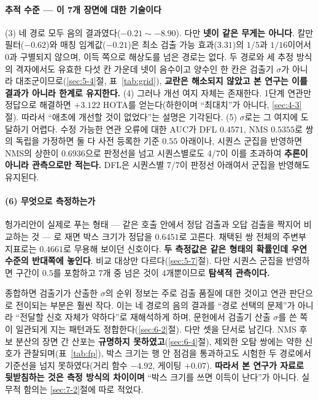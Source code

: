 \documentclass[12pt,a4paper,oneside]{report}
\begin{document}
\paragraph{추적 수준 --- 이 7개 장면에 대한 기술이다} (3) 네 경로 모두 음의 결과였다($-0.21 \sim -8.90$). 다만 \textbf{넷이 같은 무게는 아니다}. 칼만 필터($-0.62$)와 매칭 임계값($-0.21$)은 최소 검출 가능 효과($3.31$)의 $1/5$과 $1/16$이어서 $0$과 구별되지 않으며, 이득 쪽으로 해상도를 넘은 경로는 없다. 두 경로와 세 추정 방식의 격자에서도 유효한 다섯 칸 가운데 넷이 음수이고 양수인 한 칸은 검출기 $\sigma$가 아니라 대조군이므로(\ref{sec:5-4}절, 표~\ref{tab:grid}), \textbf{교란은 해소되지 않았고 본 연구는 이를 결과가 아니라 한계로 유지한다.} (4) 그러나 개선 여지 자체는 존재한다. 1단계 연관만 정답으로 해결하면 $+3.122$ HOTA를 얻는다(하한이며 ``최대치''가 아니다, \ref{sec:4-3}절). 따라서 ``애초에 개선할 것이 없었다''는 설명은 기각된다. (5) $\sigma$로는 그 여지에 도달하기 어렵다. 수정 가능한 연관 오류에 대한 AUC가 DFL $0.4571$, NMS $0.5355$로 쌍의 독립을 가정하면 둘 다 사전 등록한 기준 $0.55$ 아래이나, 시퀀스 군집을 반영하면 NMS의 상한이 $0.6936$으로 판정선을 넘고 시퀀스별로도 4/7이 이를 초과하여 \textbf{추론이 아니라 관측으로만 적는다.} DFL은 시퀀스별 7/7이 판정선 아래여서 군집을 반영해도 유지된다.

\paragraph{(6) 무엇으로 측정하는가} 헝가리안이 실제로 푸는 형태 --- 같은 호출 안에서 정답 검출과 오답 검출을 짝지어 비교하는 것 --- 로 재면 박스 크기가 정답을 $0.6451$로 고른다. 채택된 쌍 전체의 주변부 지표로는 $0.4661$로 무용해 보이던 신호이다. \textbf{두 측정값은 같은 형태의 확률인데 우연 수준의 반대쪽에 놓인다}. 비교 대상만 다르다(\ref{sec:5-7}절). 다만 시퀀스 군집을 반영하면 구간이 $0.5$를 포함하고 7개 중 넘은 것이 4개뿐이므로 \textbf{탐색적 관측이다.}

종합하면 검출기가 산출한 $\sigma$의 순위 정보는 주로 검출 품질에 대한 것이고 연관 판단으로 전이되는 부분은 훨씬 작다. 이는 네 경로의 음의 결과를 ``경로 선택의 문제''가 아니라 ``전달할 신호 자체가 약하다''로 재해석하게 하며, 문헌에서 검출기 산출 $\sigma$를 쓴 쪽이 일관되게 지는 패턴과도 정합한다(\ref{sec:6-2}절). 다만 셋을 단서로 남긴다. NMS 후보 분산의 장면 간 산포는 \textbf{규명하지 못하였고}(\ref{sec:6-4}절), 제외한 오탐 쌍에는 약한 신호가 관찰되며(표~\ref{tab:fp}), 박스 크기는 행 안 점검을 통과하고도 시험한 두 경로에서 기준선을 넘지 못하였다(거리 함수 $-4.92$, 게이팅 $+0.07$). \textbf{따라서 본 연구가 자료로 뒷받침하는 것은 측정 방식의 차이이며} ``박스 크기를 쓰면 이득이 난다''가 아니다. 실무적 함의는 \ref{sec:7-2}절에 따로 적었다.
\end{document}
